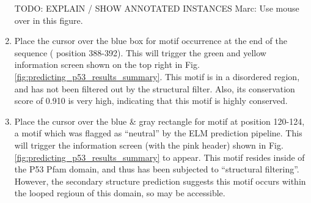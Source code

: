 \begin{enumerate}

TODO: EXPLAIN / SHOW ANNOTATED INSTANCES Marc: Use mouse over in this figure.

\item Place the cursor over the blue box for motif occurrence 
	 at the end of the sequence (
	position 388-392). This will trigger the green and yellow 
	information screen shown on the top right in Fig.
	\ref{fig:predicting_p53_results_summary}.
	This motif is in a disordered region, and has not been
	filtered out by the structural filter. Also, its conservation score
	of 0.910 is very high, indicating that this motif is highly conserved.


\item Place the cursor over the blue \& gray rectangle for motif
	 at position 120-124, a motif 
	which was flagged as ``neutral'' by the ELM prediction pipeline.
	This will trigger the information screen (with the pink header) shown
	in Fig. \ref{fig:predicting_p53_results_summary} to appear.
	This motif resides inside of the P53 Pfam domain, and thus has been
	subjected to ``structural filtering''. However, the secondary structure
	prediction suggests this motif occurs within the looped regioun of this
	domain, so may be accessible.



\end{enumerate}
